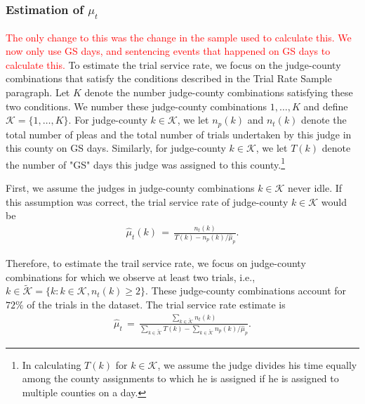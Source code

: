 \documentclass[11pt]{article}
\begin{document}
    \subsubsection{Estimation of $\mu_t$}
      \label{mu_t-estimation}
      \textcolor{red}{The only change to this was the change in the sample used to calculate this. We now only use GS days, and sentencing events that happened on GS days to calculate this.}
      To estimate the trial service rate, we focus on the judge-county combinations that satisfy the conditions described in the Trial Rate Sample paragraph. Let $K$ denote the number judge-county combinations satisfying these two conditions. We number these judge-county combinations $1,\ldots,K$ and define $\mathcal{K} = \{1,\ldots,K\}$. For judge-county $k \in \mathcal{K}$, we let $n_p(k)$ and $n_t(k)$ denote the total number of pleas and the total number of trials undertaken by this judge in this county on GS days. Similarly, for judge-county $k \in \mathcal{K}$, we let $T(k)$ denote the number of "GS" days this judge was assigned to this county.\footnote{In calculating $T(k)$ for $k\in\mathcal{K}$, we assume the judge divides his time equally among the county assignments to which he is assigned if he is assigned to multiple counties on a day.}

			First, we assume the judges in judge-county combinations $k\in\mathcal{K}$ never idle. If this assumption was correct, the trial service rate of judge-county $k\in\mathcal{K}$ would be
			\begin{align*}
				\hat{\mu}_t(k) \,=\, \frac{n_t(k)}{T(k) - n_p(k) / \hat{\mu}_p}.
			\end{align*}

      Therefore, to estimate the trail service rate, we focus on judge-county combinations for which we observe at least two trials, i.e., $k \in \tilde{\mathcal{K}} = \{k:k\in\mathcal{K},n_t(k)\geq 2\}$. These judge-county combinations account for $72\%$ of the trials in the dataset. The trial service rate estimate is
			\begin{align*}
				\hat{\mu}_t \,=\, \frac{ \sum\limits_{k\in\tilde{\mathcal{K}}} n_t(k) }{\sum\limits_{k\in\tilde{\mathcal{K}}} T(k) - \sum\limits_{k\in\tilde{\mathcal{K}}} n_p(k) / \hat{\mu}_p }.
			\end{align*}
\end{document}
